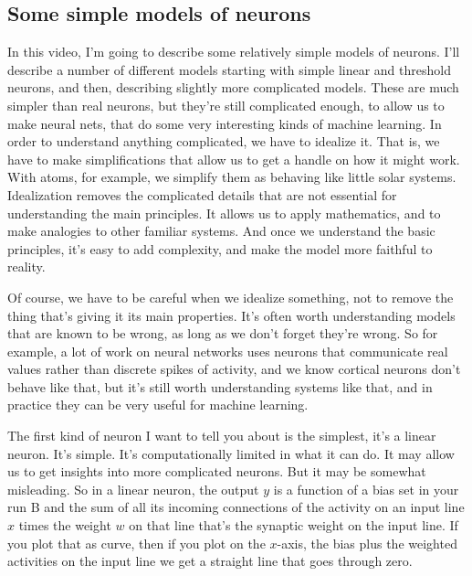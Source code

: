 \subsection{Some simple models of neurons}

\begin{multicols}{2}
\begin{footnotesize}
In this video, I'm going to describe some relatively simple models of neurons. I'll describe a number of different models starting with simple linear and threshold neurons, and then, describing slightly more complicated models. These are much simpler than real neurons, but they're still complicated enough, to allow us to make neural nets, that do some very interesting kinds of machine learning. In order to understand anything complicated, we have to idealize it. That is, we have to make simplifications that allow us to get a handle on how it might work. With atoms, for example, we simplify them as behaving like little solar systems. Idealization removes the complicated details that are not essential for understanding the main principles. It allows us to apply mathematics, and to make analogies to other familiar systems. And once we understand the basic principles, it's easy to add complexity, and make the model more faithful to reality.

Of course, we have to be careful when we idealize something, not to remove the thing that's giving it its main properties. It's often worth understanding models that are known to be wrong, as long as we don't forget they're wrong. So for example, a lot of work on neural networks uses neurons that communicate real values rather than discrete spikes of activity, and we know cortical neurons don't behave like that, but it's still worth understanding systems like that, and in practice they can be very useful for machine learning.

The first kind of neuron I want to tell you about is the simplest, it's a linear neuron. It's simple. It's computationally limited in what it can do. It may allow us to get insights into more complicated neurons. But it may be somewhat misleading. So in a linear neuron, the output $y$ is a function of a bias set in your run B and the sum of all its incoming connections of the activity on an input line $x$ times the weight $w$ on that line that's the synaptic weight on the input line. If you plot that as curve, then if you plot on the $x$-axis, the bias plus the weighted activities on the input line we get a straight line that goes through zero.


\end{footnotesize}
\end{multicols}
